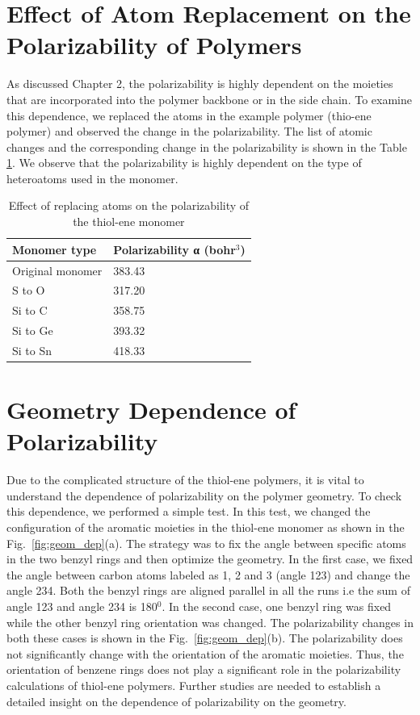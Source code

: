 \Appendix{}

\label{appendix:B}

\section{Effect of Atom Replacement on the Polarizability of Polymers}

As discussed Chapter 2, the polarizability is highly dependent on the moieties that are incorporated into the polymer backbone or in the side chain. To examine this dependence, we replaced the atoms in the example polymer (thio-ene polymer) and observed the change in the polarizability. The list of atomic changes and the corresponding change in the polarizability is shown in the Table \ref{atom_dep}. We observe that the polarizability is highly dependent on the type of heteroatoms used in the monomer.


\begin{table}[]
	\centering
	\caption{Effect of replacing atoms on the polarizability of the thiol-ene monomer }
	\label{atom_dep}
	\begin{tabular}{ll}
		\hline
		Monomer type     & Polarizability α (bohr$^3$) \\ \hline
		Original monomer & 383.43                   \\
		S to O           & 317.20                   \\
		Si to C          & 358.75                   \\ 
		Si to Ge         & 393.32                   \\
		Si to Sn         & 418.33                  
	\end{tabular}
\end{table}

\section{Geometry Dependence of Polarizability}

Due to the complicated structure of the thiol-ene polymers, it is vital to understand the dependence of polarizability on the polymer geometry. To check this dependence, we performed a simple test. In this test, we changed the configuration of the aromatic moieties in the thiol-ene monomer as shown in the Fig.\ \ref{fig:geom_dep}(a). The strategy was to fix the angle between specific atoms in the two benzyl rings and then optimize the geometry. In the first case, we fixed the angle between carbon atoms labeled as 1, 2 and 3 (angle 123) and change the angle 234. Both the benzyl rings are aligned parallel in all the runs i.e the sum of angle 123 and angle 234 is 180$^0$. In the second case, one benzyl ring was fixed while the other benzyl ring orientation was changed. The polarizability changes in both these cases is shown in the Fig.\ \ref{fig:geom_dep}(b). The polarizability does not significantly change with the orientation of the aromatic moieties. Thus, the orientation of benzene rings does not play a significant role in the polarizability calculations of thiol-ene polymers. Further studies are needed to establish a detailed insight on the dependence of polarizability on the geometry. 

